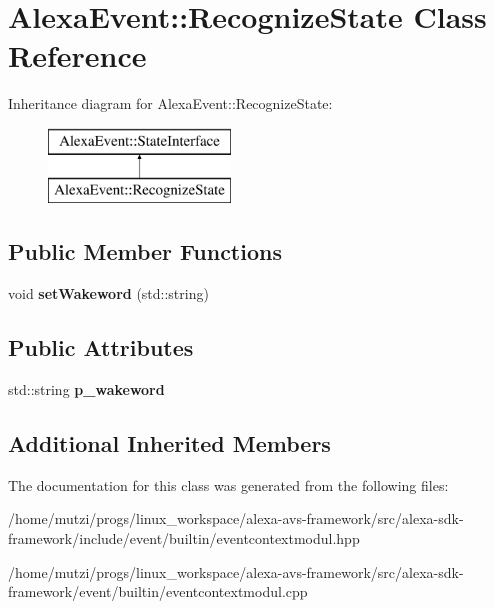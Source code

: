 \hypertarget{classAlexaEvent_1_1RecognizeState}{}\section{Alexa\+Event\+:\+:Recognize\+State Class Reference}
\label{classAlexaEvent_1_1RecognizeState}
Inheritance diagram for Alexa\+Event\+:\+:Recognize\+State\+:\begin{figure}[H]
\begin{center}
\leavevmode
\includegraphics[height=2.000000cm]{dc/daf/classAlexaEvent_1_1RecognizeState}
\end{center}
\end{figure}
\subsection*{Public Member Functions}
\begin{DoxyCompactItemize}
\item 
\mbox{\label{classAlexaEvent_1_1RecognizeState_ab6ca77fea1f64e68c8fd60b93699d71c}} 
void {\bfseries set\+Wakeword} (std\+::string)
\end{DoxyCompactItemize}
\subsection*{Public Attributes}
\begin{DoxyCompactItemize}
\item 
\mbox{\label{classAlexaEvent_1_1RecognizeState_a7ead4abddcc229011f897dba6dbaf15b}} 
std\+::string {\bfseries p\+\_\+wakeword}
\end{DoxyCompactItemize}
\subsection*{Additional Inherited Members}


The documentation for this class was generated from the following files\+:\begin{DoxyCompactItemize}
\item 
/home/mutzi/progs/linux\+\_\+workspace/alexa-\/avs-\/framework/src/alexa-\/sdk-\/framework/include/event/builtin/eventcontextmodul.\+hpp\item 
/home/mutzi/progs/linux\+\_\+workspace/alexa-\/avs-\/framework/src/alexa-\/sdk-\/framework/event/builtin/eventcontextmodul.\+cpp\end{DoxyCompactItemize}

